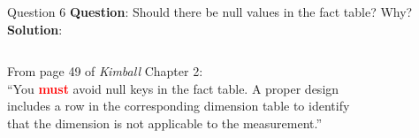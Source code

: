 \begin{frame}[fragile]{Question 6}
	\textbf{Question}: Should there be null values in the fact table? Why?
	\\\vspace{10pt}
	\textbf{Solution}: 
	\\\vspace{5pt}
	\begin{columns}[t,onlytextwidth]
	From page 49 of \textit{Kimball} Chapter 2:\\\vspace{5pt}
	``You \textcolor{red}{\textbf{must}} avoid null keys in the fact table. A proper design includes a row in the corresponding dimension table to identify that the dimension is not applicable to the measurement.''
	\begin{figure}
		\vspace{-15pt}
	\end{figure}
\end{columns}	
\end{frame}

